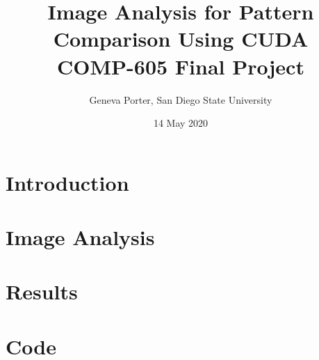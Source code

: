 \documentclass[12pt]{article}
\title{Image Analysis for Pattern Comparison Using CUDA \\ {\normal COMP-605 Final Project}}
\author{Geneva Porter, San Diego State University}
\date{14 May 2020}
\begin{document}
\maketitle
\pagebreak

\section*{Introduction}

\section*{Image Analysis}

\section*{Results}

\section*{Code}
\end{document}
